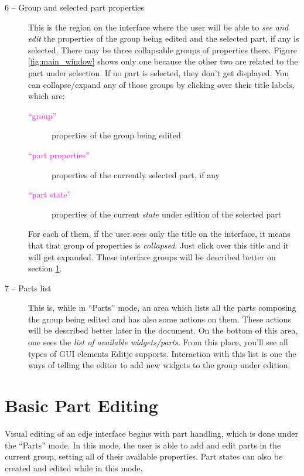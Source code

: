 \documentclass[a4paper]{profusion}
\newcommand{\GUILabel}[1]{\textcolor{magenta}{#1}}
\begin{document}
\begin{description}
\item[6 -- Group and selected part properties] This is the region on
  the interface where the user will be able to \emph{see and edit} the
  properties of the group being edited and the selected part, if any
  is selected. There may be three collapsable groups of properties
  there. Figure \ref{fig:main_window} shows only one because the other
  two are related to the part under selection. If no part is selected,
  they don't get displayed. You can collapse/expand any of those
  groups by clicking over their title labels, which are:

  \begin{description}
    \item[\GUILabel{``group''}] properties of the group being edited
    \item[\GUILabel{``part properties''}] properties of the currently
      selected part, if any
    \item[\GUILabel{``part state''}] properties of the current
      \emph{state} under edition of the selected part
  \end{description}

For each of them, if the user sees only the title on the interface, it
means that that group of properties is \emph{collapsed}. Just click
over this title and it will get expanded. These interface groups will
be described better on section \ref{sec:part_editing}.

\item[7 -- Parts list] This is, while in ``Parts'' mode, an area which
  lists all the parts composing the group being edited and has also
  some actions on them. These actions will be described better later
  in the document. On the bottom of this area, one sees the \emph{list
    of available widgets/parts}. From this place, you'll see all types
  of GUI elements Editje supports. Interaction with this list is one
  the ways of telling the editor to add new widgets to the group under
  edition.

\end{description}

\section{Basic Part Editing}
\label{sec:part_editing}

Visual editing of an edje interface begins with part handling, which
is done under the ``Parts'' mode. In this mode, the user is able to
add and edit parts in the current group, setting all of their
available properties. Part states can also be created and edited while
in this mode.
\end{document}

